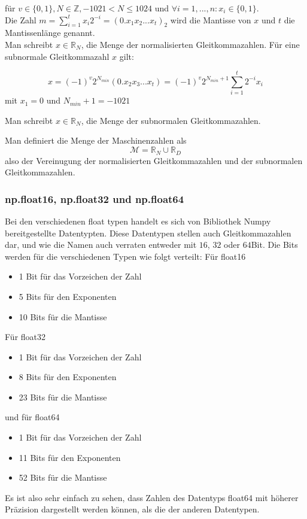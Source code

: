 \documentclass{scrartcl}
\begin{document}
\begin{flushleft}
    für \(v \in \{0, 1\}, N \in \mathbb{Z}, -1021 < N \leqslant 1024\) und \(\forall i = 1,...,n: x_i \in \{0, 1\} \). \\
    Die Zahl \( m =  \sum_{i=1}^{t}x_i 2^{-i} = (0.x_1x_2...x_t)_2 \) wird die Mantisse von \(x\) und \(t\) die Mantissenlänge genannt.        \\
    Man schreibt \(x \in \mathbb{R}_N \), die Menge der normalisierten Gleitkommazahlen.
    Für eine subnormale Gleitkommazahl \(x\) gilt: \end{flushleft} \[x = (-1)^v
    2^{N_{min}} (0.x_2x_3.
    ..x_t) = (-1)^v 2^{N_{min}+1} \sum_{i=1}^{t} 2^{-i}x_i \]
mit \(x_1 = 0\) und \(N_{min} + 1 = -1021 \)
\begin{flushleft}
    Man schreibt \(x \in \mathbb{R}_N \), die Menge der subnormalen
    Gleitkommazahlen.

    Man definiert die Menge der Maschinenzahlen als \[\mathcal{M} = \mathbb{R}_N
        \cup \mathbb{R}_D \] also der Vereinugung der normalisierten Gleitkommazahlen
    und der subnormalen Gleitkommazahlen.
\end{flushleft}

\subsubsection{np.float16, np.float32 und np.float64}
Bei den verschiedenen float typen handelt es sich von Bibliothek Numpy
bereitgestellte Datentypten.
Diese Datentypen stellen auch Gleitkommazahlen dar, und wie die Namen auch
verraten entweder mit \(16\), \(32\) oder \(64\)Bit.
Die Bits werden für die verschiedenen Typen wie folgt verteilt:
Für float16
\begin{itemize}
    \item 1 Bit für das Vorzeichen der Zahl                                                               %
    \item 5 Bits für den Exponenten
    \item 10 Bits für die Mantisse
\end{itemize}
Für float32
\begin{itemize}
    \item 1 Bit für das Vorzeichen der Zahl                                                                 %
    \item 8 Bits für den Exponenten
    \item 23 Bits für die Mantisse
\end{itemize}
und für float64
\begin{itemize}
    \item 1 Bit für das Vorzeichen der Zahl
    \item 11 Bits für den Exponenten
    \item 52 Bits für die Mantisse
\end{itemize}
Es ist also sehr einfach zu sehen, dass Zahlen des Datentyps float64 mit
höherer Präzision dargestellt werden können, als die der anderen Datentypen.
\end{document}
